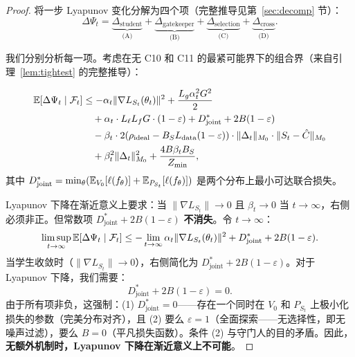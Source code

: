 \begin{proof}
将一步 Lyapunov 变化分解为四个项（完整推导见第~\ref{sec:decomp} 节）：
\begin{equation}
    \Delta\Psi_t = \underbrace{\Delta_{\text{student}}}_{\text{(A)}} + \underbrace{\Delta_{\text{gatekeeper}}}_{\text{(B)}} + \underbrace{\Delta_{\text{selection}}}_{\text{(C)}} + \underbrace{\Delta_{\text{cross}}}_{\text{(D)}}.
\end{equation}

我们分别分析每一项。考虑在无 C10 和 C11 的最紧可能界下的组合界（来自引理~\ref{lem:tightest} 的完整推导）：

\begin{align}
    \mathbb{E}[\Delta\Psi_t \mid \mathcal{F}_t] &\leq -\alpha_t \|\nabla L_{S_t}(\theta_t)\|^2 + \frac{L_g \alpha_t^2 G^2}{2} \notag\\
    &\quad + \alpha_t \cdot L_\ell L_f G \cdot (1 - \varepsilon) + D_{\text{joint}}^* + 2B(1-\varepsilon) \notag\\
    &\quad - \beta_t \cdot 2(\rho_{\text{ideal}} - B_S L_{\text{data}}(1-\varepsilon)) \cdot \|\Delta_t\|_{M_0} \cdot \|S_t - \hat{C}\|_{M_0} \notag\\
    &\quad + \beta_t^2 \|\Delta_t\|_{M_0}^2 + \frac{4B \beta_t B_S}{Z_{\min}},
\end{align}
其中 $D_{\text{joint}}^* = \min_\theta (\mathbb{E}_{V_0}[\ell(f_\theta)] + \mathbb{E}_{P_{S_t}}[\ell(f_\theta)])$ 是两个分布上最小可达联合损失。

Lyapunov 下降在渐近意义上要求：当 $\|\nabla L_{S_t}\| \to 0$ 且 $\beta_t \to 0$ 当 $t \to \infty$，右侧必须非正。但常数项 $D_{\text{joint}}^* + 2B(1-\varepsilon)$ \textbf{不消失}。令 $t \to \infty$：
\begin{equation}
    \limsup_{t \to \infty} \mathbb{E}[\Delta\Psi_t \mid \mathcal{F}_t] \leq -\lim_{t \to \infty} \alpha_t \|\nabla L_{S_t}(\theta_t)\|^2 + D_{\text{joint}}^* + 2B(1-\varepsilon).
\end{equation}
当学生收敛时（$\|\nabla L_{S_t}\| \to 0$），右侧简化为 $D_{\text{joint}}^* + 2B(1-\varepsilon)$。对于 Lyapunov 下降，我们需要：
\begin{equation}
    D_{\text{joint}}^* + 2B(1-\varepsilon) = 0.
\end{equation}
由于所有项非负，这强制：(1) $D_{\text{joint}}^* = 0$——存在一个同时在 $V_0$ 和 $P_{S_t}$ 上极小化损失的参数（完美分布对齐），且 (2) 要么 $\varepsilon = 1$（全面探索——无选择性，即无噪声过滤），要么 $B = 0$（平凡损失函数）。条件 (2) 与守门人的目的矛盾。因此，\textbf{无额外机制时，Lyapunov 下降在渐近意义上不可能}。
\end{proof}

